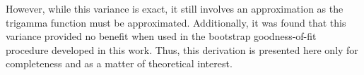 \documentclass[submit]{smj}
\begin{document}
However, while this variance is exact, it still involves an approximation as the trigamma function must be approximated. Additionally, it was found that
this variance provided no benefit when used in the bootstrap goodness-of-fit procedure developed in this work. Thus, this derivation is presented here only
for completeness and as a matter of theoretical interest.





%

\iffalse
\end{document}
